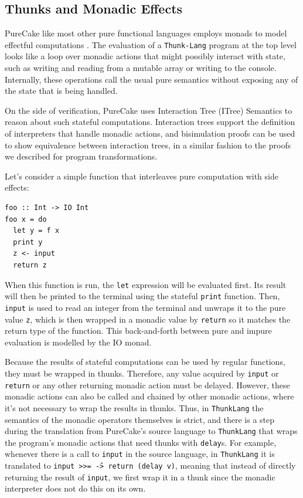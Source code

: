 \documentclass[sigconf]{acmart}
\newcommand{\hsinl}[1]{\texttt{#1}}
\newcommand{\code}[1]{\texttt{#1}}
\newcommand{\ThunkLang}{\code{ThunkLang}}
\begin{document}
\subsection{Thunks and Monadic Effects}
\label{subsec:thunks-and-monads}
PureCake like most other pure functional languages employs monads to model
effectful computations \cite{monads}. The evaluation of a
\texttt{Thunk-\allowbreak Lang} program
at the top level looks like a loop over monadic actions that might possibly
interact with state, such as writing and reading from a mutable array or writing
to the console. Internally, these operations call the usual pure semantics
without exposing any of the state that is being handled.

On the side of verification, PureCake uses Interaction Tree (ITree) Semantics
\cite{itrees} to reason about such stateful computations. Interaction trees
support the definition of interpreters that handle monadic actions, and
bisimulation proofs can be used to show equivalence between interaction trees,
in a similar fashion to the proofs we described for program transformations.

Let's consider a simple function that interleaves pure computation with side
effects:
\begin{verbatim}
foo :: Int -> IO Int
foo x = do
  let y = f x
  print y
  z <- input
  return z
\end{verbatim}
When this function is run, the \code{let} expression will be evaluated first.
Its result will then be printed to the terminal using the stateful \code{print}
function. Then, \code{input} is used to read an integer from the terminal and
unwraps it to the pure value \code{z}, which is then wrapped in a monadic value
by \code{return} so it matches the return type of the function. This
back-and-forth between pure and impure evaluation is modelled by the IO monad.

Because the results of stateful computations can be used by regular functions,
they must be wrapped in thunks. Therefore, any value acquired by \code{input} or
\code{return} or any other returning monadic action must be delayed. However,
these monadic actions can also be called and chained by other monadic actions,
where it's not necessary to wrap the results in thunks. Thus, in \ThunkLang{}
the semantics of the monadic operators themselves is strict, and there is a
step during the translation from PureCake's source language to \ThunkLang{} that
wraps the program's monadic actions that need thunks with \code{delay}s. For
example, whenever there is a call to \code{input} in the source language, in
\ThunkLang{} it is translated to \hsinl{input >>= \v -> return (delay v)},
meaning that instead of directly returning the result of \code{input}, we first
wrap it in a thunk since the monadic interpreter does not do this on its own.
\end{document}

